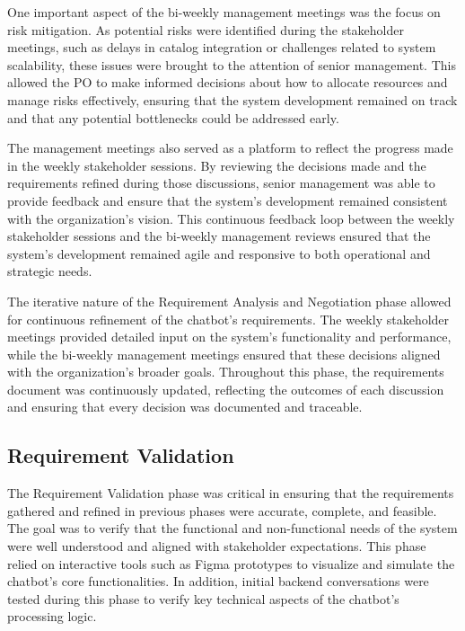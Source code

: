 One important aspect of the bi-weekly management meetings was the focus on risk mitigation. As potential risks were
identified during the stakeholder meetings, such as delays in catalog integration or challenges related to system
scalability, these issues were brought to the attention of senior management. This allowed the \acs{PO} to make
informed decisions about how to allocate resources and manage risks effectively, ensuring that the system development
remained on track and that any potential bottlenecks could be addressed early.

The management meetings also served as a platform to reflect the progress made in the weekly stakeholder sessions. By
reviewing the decisions made and the requirements refined during those discussions, senior management was able to
provide feedback and ensure that the system’s development remained consistent with the organization’s vision. This
continuous feedback loop between the weekly stakeholder sessions and the bi-weekly management reviews ensured that the
system’s development remained agile and responsive to both operational and strategic needs.

The iterative nature of the Requirement Analysis and Negotiation phase allowed for continuous refinement of the
chatbot’s requirements. The weekly stakeholder meetings provided detailed input on the system’s functionality and
performance, while the bi-weekly management meetings ensured that these decisions aligned with the organization’s
broader goals. Throughout this phase, the requirements document was continuously updated, reflecting the outcomes of
each discussion and ensuring that every decision was documented and traceable.

\subsection{Requirement Validation}\label{subsec:requirement-validation}

The Requirement Validation phase was critical in ensuring that the requirements gathered and refined in previous phases
were accurate, complete, and feasible. The goal was to verify that the functional and non-functional needs of the system
were well understood and aligned with stakeholder expectations. This phase relied on interactive tools such as Figma
prototypes to visualize and simulate the chatbot’s core functionalities. In addition, initial backend conversations were
tested during this phase to verify key technical aspects of the chatbot’s processing logic.

